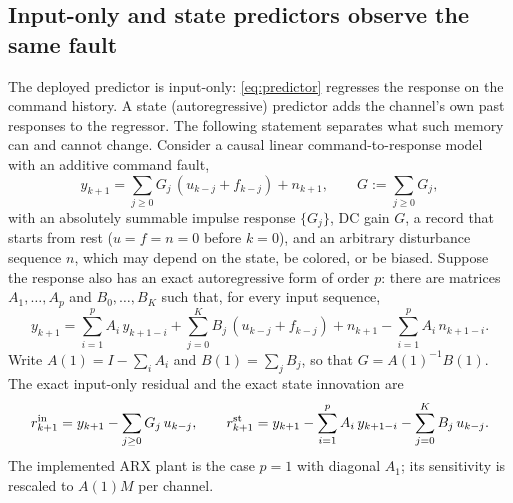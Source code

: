 %

\subsection{Input-only and state predictors observe the same fault}
\label{uniapp:firarx}

The deployed predictor is input-only: \eqref{eq:predictor} regresses the
response on the command history. A state (autoregressive) predictor adds the
channel's own past responses to the regressor. The following statement
separates what such memory can and cannot change. Consider a causal linear
command-to-response model with an additive command fault,
\begin{equation}
 y_{k+1}=\sum_{j\ge0}G_j\,(u_{k-j}+f_{k-j})+n_{k+1},
 \qquad G:=\sum_{j\ge0}G_j,
 \label{uniapp:lti}
\end{equation}
with an absolutely summable impulse response $\{G_j\}$, DC gain $G$, a record
that starts from rest ($u=f=n=0$ before $k=0$), and an arbitrary disturbance
sequence $n$, which may depend on the state, be colored, or be biased.
Suppose the response also has an exact autoregressive form of
order $p$: there are matrices $A_1,\dots,A_p$ and $B_0,\dots,B_K$ such that,
for every input sequence,
\begin{equation}
 y_{k+1}=\sum_{i=1}^{p}A_i\,y_{k+1-i}
        +\sum_{j=0}^{K}B_j\,(u_{k-j}+f_{k-j})+n_{k+1}
        -\sum_{i=1}^{p}A_i\,n_{k+1-i}.
 \label{uniapp:arx}
\end{equation}
Write $A(1)=I-\sum_iA_i$ and $B(1)=\sum_jB_j$, so that $G=A(1)^{-1}B(1)$.
The exact input-only residual and the exact state innovation are
\begin{equation}
 r^{\rm in}_{k+1}=y_{k+1}-\sum_{j\ge0}G_j\,u_{k-j},\qquad
 r^{\rm st}_{k+1}=y_{k+1}-\sum_{i=1}^{p}A_i\,y_{k+1-i}-\sum_{j=0}^{K}B_j\,u_{k-j}.
 \label{uniapp:tworesiduals}
\end{equation}
The implemented ARX plant is the case $p=1$ with diagonal $A_1$; its
sensitivity is rescaled to $A(1)M$ per channel.

